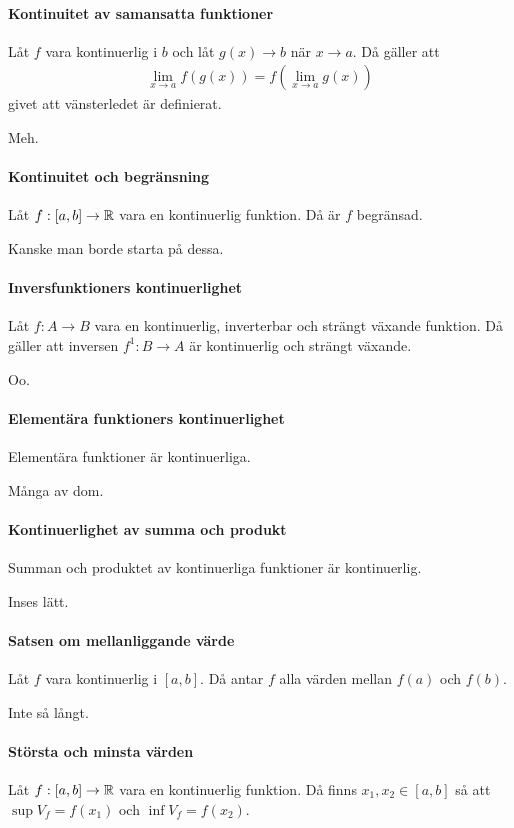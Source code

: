 \paragraph{Kontinuitet av samansatta funktioner}
Låt $f$ vara kontinuerlig i $b$ och låt $g(x)\to b$ när $x\to a$. Då gäller att
\begin{align*}
	\lim\limits_{x\to a}f(g(x)) = f(\lim\limits_{x\to a}g(x))
\end{align*}
givet att vänsterledet är definierat.

\proof
Meh.

\paragraph{Kontinuitet och begränsning}
Låt $f: [a,b]\to\mathbb{R}$ vara en kontinuerlig funktion. Då är $f$ begränsad.

\proof
Kanske man borde starta på dessa.

\paragraph{Inversfunktioners kontinuerlighet}
Låt $f: A\to B$ vara en kontinuerlig, inverterbar och strängt växande funktion. Då gäller att inversen $f^{1}: B\to A$ är kontinuerlig och strängt växande.

\proof
Oo.

\paragraph{Elementära funktioners kontinuerlighet}
Elementära funktioner är kontinuerliga.

\proof
Många av dom.

\paragraph{Kontinuerlighet av summa och produkt}
Summan och produktet av kontinuerliga funktioner är kontinuerlig.

\proof
Inses lätt.

\paragraph{Satsen om mellanliggande värde}
Låt $f$ vara kontinuerlig i $[a, b]$. Då antar $f$ alla värden mellan $f(a)$ och $f(b)$.

\proof
Inte så långt.

\paragraph{Största och minsta värden}
Låt $f: [a,b]\to\mathbb{R}$ vara en kontinuerlig funktion. Då finns $x_1, x_2\in [a,b]$ så att $\sup{V_f} = f(x_1)$ och $\inf{V_f} = f(x_2)$.

